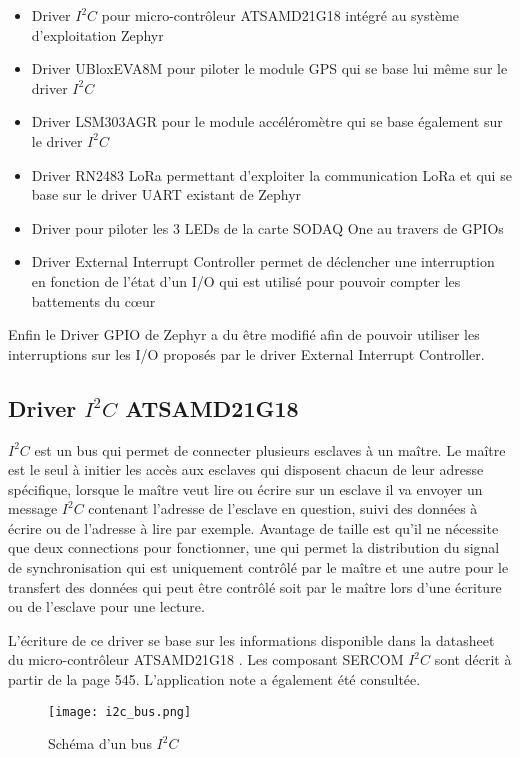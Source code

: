 \begin{itemize}
\item Driver $I^{2}C$ pour micro-contrôleur ATSAMD21G18 intégré au système d'exploitation Zephyr
\item Driver UBloxEVA8M pour piloter le module GPS qui se base lui même sur le driver $I^{2}C$
\item Driver LSM303AGR pour le module accéléromètre qui se base également sur le driver  $I^{2}C$
\item Driver RN2483 LoRa permettant d'exploiter la communication LoRa et qui se base sur le driver UART existant de Zephyr
\item Driver pour piloter les 3 LEDs de la carte SODAQ One au travers de GPIOs
\item Driver External Interrupt Controller permet de déclencher une interruption en fonction de l'état d'un I/O qui est utilisé pour pouvoir compter les battements du cœur
\end{itemize}

Enfin le Driver GPIO de Zephyr a du être modifié afin de pouvoir utiliser les interruptions sur les I/O proposés par le driver External Interrupt Controller.

\subsection{Driver $I^{2}C$ ATSAMD21G18}

$I^{2}C$ est un bus qui permet de connecter plusieurs esclaves à un maître. Le maître est le seul à initier les accès aux esclaves qui disposent chacun de leur adresse spécifique, lorsque le maître veut lire ou écrire sur un esclave il va envoyer un message $I^{2}C$ contenant l'adresse de l'esclave en question, suivi des données à écrire ou de l'adresse à lire par exemple. Avantage de taille est qu'il ne nécessite que deux connections pour fonctionner, une qui permet la distribution du signal de synchronisation qui est uniquement contrôlé par le maître et une autre pour le transfert des données qui peut être contrôlé soit par le maître lors d'une écriture ou de l'esclave pour une lecture.

L'écriture de ce driver se base sur les informations disponible dans la datasheet du micro-contrôleur ATSAMD21G18 \cite{samd21-datasheet}. Les composant SERCOM $I^{2}C$ sont décrit à partir de la page 545. L'application note \cite{samd21-i2c-configuration} a également été consultée.

\begin{figure}[htb]
\centering 
\texttt{[image: i2c\_bus.png]} 
\caption{Schéma d'un bus $I^{2}C$}
\label{fig:i2c_bus}
\end{figure}

